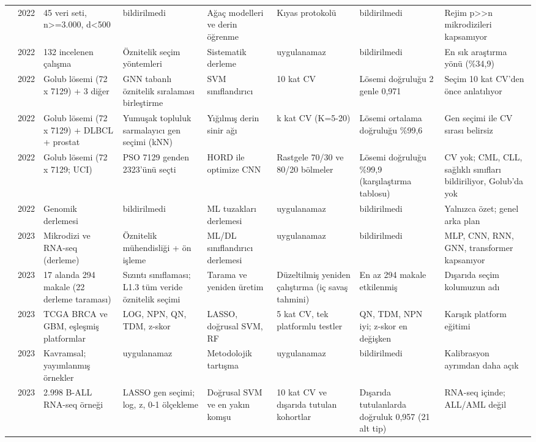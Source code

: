 \begin{longtable}{@{}p{0.9cm}p{0.5cm}p{2.3cm}p{2.6cm}p{2.6cm}p{2.3cm}p{2.6cm}p{2.4cm}@{}}
\cite{grinsztajn2022} & 2022 & 45 veri seti, n>=3.000, d<500 & bildirilmedi & Ağaç modelleri ve derin öğrenme & Kıyas protokolü & bildirilmedi & Rejim p>>n mikrodizileri kapsamıyor\\
\cite{alhenawi2022} & 2022 & 132 incelenen çalışma & Öznitelik seçim yöntemleri & Sistematik derleme & uygulanamaz & bildirilmedi & En sık araştırma yönü (\%34,9)\\
\cite{xie2022} & 2022 & Golub lösemi (72 x 7129) + 3 diğer & GNN tabanlı öznitelik sıralaması birleştirme & SVM sınıflandırıcı & 10 kat CV & Lösemi doğruluğu 2 genle 0,971 & Seçim 10 kat CV'den önce anlatılıyor\\
\cite{rezaee2022} & 2022 & Golub lösemi (72 x 7129) + DLBCL + prostat & Yumuşak topluluk sarmalayıcı gen seçimi (kNN) & Yığılmış derin sinir ağı & k kat CV (K=5-20) & Lösemi ortalama doğruluğu \%99,6 & Gen seçimi ile CV sırası belirsiz\\
\cite{awotunde2022} & 2022 & Golub lösemi (72 x 7129; UCI) & PSO 7129 genden 2323'ünü seçti & HORD ile optimize CNN & Rastgele 70/30 ve 80/20 bölmeler & Lösemi doğruluğu \%99,9 (karşılaştırma tablosu) & CV yok; CML, CLL, sağlıklı sınıfları bildiriliyor, Golub'da yok\\
\cite{whalen2022} & 2022 & Genomik derlemesi & bildirilmedi & ML tuzakları derlemesi & uygulanamaz & bildirilmedi & Yalnızca özet; genel arka plan\\
\cite{alharbi2023} & 2023 & Mikrodizi ve RNA-seq (derleme) & Öznitelik mühendisliği + ön işleme & ML/DL sınıflandırıcı derlemesi & uygulanamaz & bildirilmedi & MLP, CNN, RNN, GNN, transformer kapsanıyor\\
\cite{kapoor2023} & 2023 & 17 alanda 294 makale (22 derleme taraması) & Sızıntı sınıflaması; L1.3 tüm veride öznitelik seçimi & Tarama ve yeniden üretim & Düzeltilmiş yeniden çalıştırma (iç savaş tahmini) & En az 294 makale etkilenmiş & Dışarıda seçim kolumuzun adı\\
\cite{foltz2023} & 2023 & TCGA BRCA ve GBM, eşleşmiş platformlar & LOG, NPN, QN, TDM, z-skor & LASSO, doğrusal SVM, RF & 5 kat CV, tek platformlu testler & QN, TDM, NPN iyi; z-skor en değişken & Karışık platform eğitimi\\
\cite{vancalster2023} & 2023 & Kavramsal; yayımlanmış örnekler & uygulanamaz & Metodolojik tartışma & uygulanamaz & bildirilmedi & Kalibrasyon ayrımdan daha açık\\
\cite{beder2023} & 2023 & 2.998 B-ALL RNA-seq örneği & LASSO gen seçimi; log, z, 0-1 ölçekleme & Doğrusal SVM ve en yakın komşu & 10 kat CV ve dışarıda tutulan kohortlar & Dışarıda tutulanlarda doğruluk 0,957 (21 alt tip) & RNA-seq içinde; ALL/AML değil\\

\end{longtable}
